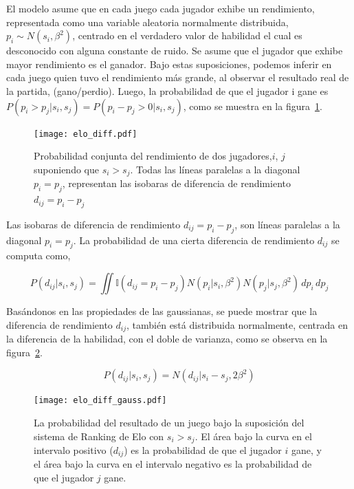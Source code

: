 \documentclass[11pt,twoside,spanish]{report} %
\begin{document}
El modelo asume que en cada juego cada jugador exhibe un rendimiento, representada como una variable aleatoria normalmente distribuida, $p_i\sim N(s_i,\beta^2)$, centrado en el verdadero valor de habilidad el cual es desconocido con alguna constante de ruido.
Se asume que el jugador que exhibe mayor rendimiento es el ganador.
Bajo estas suposiciones, podemos inferir en cada juego quien tuvo el rendimiento m\'as grande, al observar el resultado real de la partida, (gano/perdio).
Luego, la probabilidad de que el jugador i gane es $P(p_i>p_j|s_i,s_j)=P(p_i-p_j>0|s_i,s_j)$, como se muestra en la figura~\ref{fig:fig6}.

\begin{figure}[H]
	\centering
	\texttt{[image: elo\_diff.pdf]}
	\caption{Probabilidad conjunta del rendimiento de dos jugadores,$i$, $j$ suponiendo que $s_i>s_j$. Todas las l\'ineas paralelas a la diagonal $p_i=p_j$, representan las isobaras de diferencia de  rendimiento $d_{ij}=p_i-p_j$ }
	\label{fig:fig6}
\end{figure}

Las isobaras de diferencia de rendimiento $d_{ij} = p_i-p_j$, son l\'ineas paralelas a la diagonal $p_i=p_j$.
La probabilidad de una cierta diferencia de rendimiento $d_{ij}$ se computa como,

\begin{equation}\label{eq:ProbDiff}
P(d_{ij}|s_i,s_j) = \iint \mathbb{I}(d_{ij}=p_i -p_j) N(p_i|s_i,\beta^2)N(p_j|s_j,\beta^2) \, dp_i \, dp_j
\end{equation}

Bas\'andonos en las propiedades de las gaussianas, se puede mostrar que la diferencia de rendimiento $d_{ij}$, tambi\'en est\'a distribuida normalmente, centrada en la diferencia de la habilidad, con el doble de varianza, como se observa en la figura~\ref{fig:fig7}.

\begin{equation}\label{eq:ProbDiff2}
P(d_{ij}|s_i,s_j) = N(d_{ij}|s_i-s_j,2\beta^2)
\end{equation}

\begin{figure}[H]
	\centering
	\texttt{[image: elo\_diff\_gauss.pdf]}
	\caption{La probabilidad del resultado de un juego bajo la suposici\'on del sistema de Ranking de Elo con $s_i>s_j$. El \'area bajo la curva en el intervalo positivo ($d_{ij}$) es la probabilidad de que el jugador $i$ gane, y el \'area bajo la curva en el intervalo negativo es la probabilidad de que el jugador $j$ gane.}
	\label{fig:fig7}
\end{figure}
\end{document}

